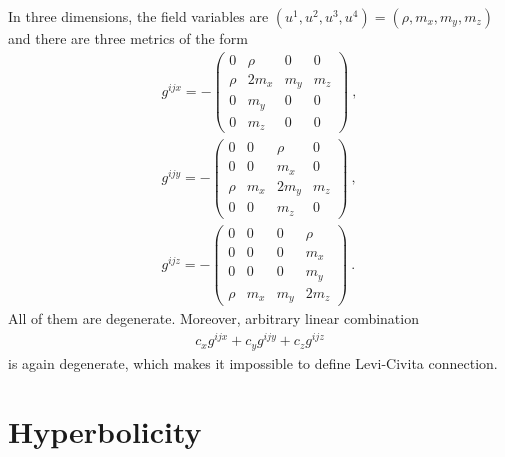 \begin{example}
    In three dimensions, the field variables are $(u^1,u^2,u^3,u^4) = (\rho, m_x,m_y,m_z)$ and there are three metrics of the form
    \begin{align}
        g^{ij x} = -\begin{pmatrix}
            0 &  \rho & 0 & 0 \\
            \rho &  2 m_x &  m_y & m_z \\
            0 & m_y & 0 & 0 \\
            0 & m_z & 0 & 0
        \end{pmatrix}  \:, \\
        g^{ij y} = -\begin{pmatrix}
            0 & 0 & \rho & 0 \\
            0 & 0 & m_x & 0\\
            \rho & m_x & 2m_y & m_z \\
            0 & 0 & m_z & 0
        \end{pmatrix}  \:, \\
        g^{ij z} = -\begin{pmatrix}
            0 & 0 & 0 & \rho \\
            0 & 0 & 0 & m_x \\
            0 & 0 & 0 & m_y \\
            \rho & m_x & m_y & 2 m_z
        \end{pmatrix}  \:.
    \end{align}
    All of them are degenerate. Moreover, arbitrary linear combination
    \begin{align}
        c_x g^{ij x} + c_y g^{ij y} + c_z g^{ij z}
    \end{align}
    is again degenerate, which makes it impossible to define Levi-Civita connection.
\end{example}



\section{Hyperbolicity}

